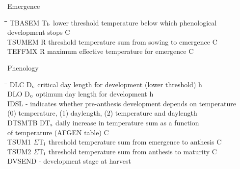 \documentclass[11pt]{article}
\begin{document}
\bigskip
Emergence\nwln
\begin{tabbing}
\hspace{1.27cm}\=\hspace{1.27cm}\=\hspace{1.27cm}\=\hspace{1.27cm}\=%
\hspace{1.27cm}\=\hspace{1.27cm}\=\hspace{1.27cm}\=\hspace{1.27cm}\=%
\hspace{1.27cm}\=\hspace{1.27cm}\=\kill
TBASEM\> \> T$_{{\rm b}}$\> lower threshold temperature below which phenological \\
\>\> \> development stops\> \> \> \> \> \> \> \degrees C\\
TSUMEM\> \> R\> threshold temperature sum from sowing to emergence\> \> \> \> \> \> \> \degrees C\\
TEFFMX\> \> R\> maximum effective temperature for emergence\> \> \> \> \> \> \> \degrees C
\end{tabbing}

\bigskip
Phenology\nwln
\begin{tabbing}
\hspace{1.27cm}\=\hspace{1.27cm}\=\hspace{1.27cm}\=\hspace{1.27cm}\=%
\hspace{1.27cm}\=\hspace{1.27cm}\=\hspace{1.27cm}\=\hspace{1.27cm}\=%
\hspace{1.27cm}\=\hspace{1.27cm}\=\kill
DLC\> \> D$_{{\rm c}}$\> critical day length for development (lower threshold)\> \> \> \> \> \> \> h\\
DLO\> \> D$_{{\rm o}}$\> optimum day length for development\> \> \> \> \> \> \> h\\
IDSL\> \> -\> indicates whether pre-anthesis development depends on temperature\\
\>\> \> (0) temperature, (1) daylength, (2) temperature and daylength\\
DTSMTB\> \> DT$_{{\rm s}}$\> daily increase in temperature sum as a function \\
\>\> \> of temperature (AFGEN table)\> \> \> \> \> \> \> \degrees C\\
TSUM1\> \> $\Sigma$T$_{{\rm i}}$\> threshold temperature sum from emergence to anthesis\> \> \> \> \> \> \> \degrees C\\
TSUM2\> \> $\Sigma$T$_{{\rm i}}$\> threshold temperature sum from anthesis to maturity\> \> \> \> \> \> \> \degrees C\\
DVSEND\> \> -\> development stage at harvest
\end{tabbing}
\end{document}
